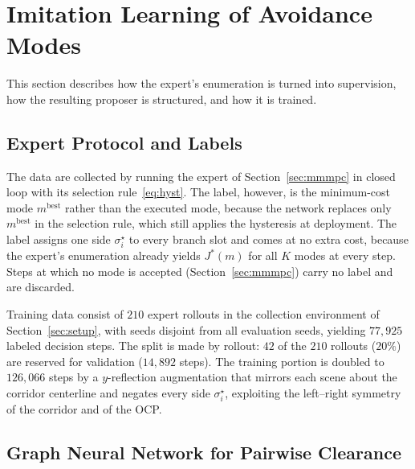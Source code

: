 \documentclass{article}
\theoremstyle{definition}
\begin{document}
\section{Imitation Learning of Avoidance Modes}
\label{sec:method}

This section describes how the expert's enumeration is turned into supervision,
how the resulting proposer is structured, and how it is trained. 

\subsection{Expert Protocol and Labels}
\label{sec:labels}

The data are collected by running the expert of Section~\ref{sec:mmmpc} in closed loop with its selection rule~\eqref{eq:hyst}. The label,
however, is the minimum-cost mode $m^{\mathrm{best}}$ rather than the executed
mode, because the network replaces only $m^{\mathrm{best}}$ in the selection rule, which still applies the hysteresis at deployment.
The label assigns one side $\sigma^\star_i$ to every branch slot and comes at no extra cost, because the expert's enumeration already yields $J^*(m)$ for all $K$ modes at every step. Steps at which no mode is accepted
(Section~\ref{sec:mmmpc}) carry no label and are discarded.

Training data consist of $210$ expert rollouts in the collection environment of Section~\ref{sec:setup}, with seeds disjoint from all evaluation seeds, yielding $77{,}925$ labeled decision steps. The split is
made by rollout: $42$ of the $210$ rollouts ($20\%$) are reserved for validation
($14{,}892$ steps). The training portion is doubled to $126{,}066$ steps by a
$y$-reflection augmentation that mirrors each scene about the corridor
centerline and negates every side $\sigma^\star_i$, exploiting the left--right
symmetry of the corridor and of the OCP.

\subsection{Graph Neural Network for Pairwise Clearance}
\label{sec:gnn}
\end{document}
